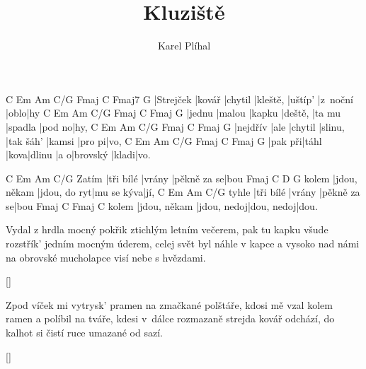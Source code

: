 \documentclass{song}
\author{Karel Plíhal}
\title{Kluziště}
\begin{document}
\strophe
C         Em\7   Am\7    C/G      Fmaj\7  C        Fmaj7 G
|Strejček |kovář |chytil |kleště, |uštíp' |z~noční |oblo|hy
C      Em\7   Am\7   C/G     Fmaj\7 C       Fmaj\7 G
|jednu |malou |kapku |deště, |ta mu |spadla |pod no|hy,
C        Em\7 Am\7    C/G     Fmaj\7    C      Fmaj\7 G
|nejdřív |ale |chytil |slinu, |tak šáh' |kamsi |pro pi|vo,
C       Em\7  Am\7 C/G    Fmaj\7 C     Fmaj\7 G
|pak při|táhl |kova|dlinu |a o|brovský |kladi|vo.
\endstrophe

      C         Em\7   Am\7        C/G
Zatím |tři bílé |vrány |pěkně za se|bou
      Fmaj\7       C            D\7        G
kolem |jdou, někam |jdou, do ryt|mu se kýva|jí,
      C         Em\7   Am\7        C/G
tyhle |tři bílé |vrány |pěkně za se|bou
      Fmaj\7       C           Fmaj\7     C
kolem |jdou, někam |jdou, nedoj|dou, nedoj|dou.
\endstrophe

\strophe*
Vydal z hrdla mocný pokřik ztichlým letním večerem,
pak tu kapku všude rozstřík' jedním mocným úderem,
celej svět byl náhle v kapce a vysoko nad námi
na obrovské mucholapce visí nebe s hvězdami.
\endstrophe

\ref{}

\strophe*
Zpod víček mi vytrysk' pramen na zmačkané polštáře,
kdosi mě vzal kolem ramen a políbil na tváře,
kdesi v~dálce rozmazaně strejda kovář odchází,
do kalhot si čistí ruce umazané od sazí.
\endstrophe

\ref{}
\end{document}
